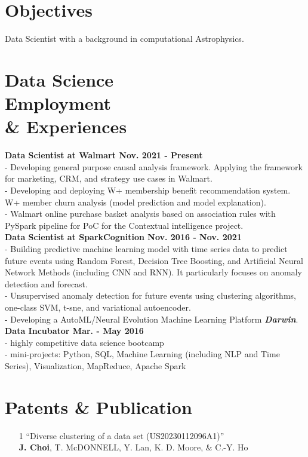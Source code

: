 \documentclass[margin,centered]{res}
\begin{document}
\begin{resume}

\vspace{-0.0cm}
\section{Objectives} Data Scientist with a background in computational Astrophysics.


\section{Data Science \\ Employment \\ \& Experiences}
{\bf Data Scientist at Walmart Nov. 2021 - Present} \\
- Developing general purpose causal analysis framework. Applying the framework for marketing, CRM, and strategy use cases in Walmart. \\
- Developing and deploying W+ membership benefit recommendation system. W+ member churn analysis (model prediction and model explanation).\\
- Walmart online purchase basket analysis based on association rules with PySpark pipeline for PoC for the Contextual intelligence project.\\
{\bf Data Scientist at SparkCognition Nov. 2016 - Nov. 2021} \\
- Building predictive machine learning model with time series data to predict future events using Random Forest, Decision Tree Boosting, and Artificial Neural Network Methods (including CNN and RNN). It particularly focuses on anomaly detection and forecast.\\
- Unsupervised anomaly detection for future events using clustering algorithms, one-class SVM, t-sne, and variational autoencoder. \\
- Developing a AutoML/Neural Evolution Machine Learning Platform {\bf {\it Darwin}}.\\
{\bf Data Incubator Mar. - May 2016}  \\
- highly competitive data science bootcamp \\
- mini-projects: Python, SQL, Machine Learning (including NLP and Time Series), Visualization, MapReduce, Apache Spark \\

\section{Patents \& Publication}
\begin{enumerate}
\item[1] ``Diverse clustering of a data set (US20230112096A1)'' \\ \textbf{J. Choi}, T. McDONNELL, Y. Lan, K. D. Moore, \& C.-Y. Ho


\end{enumerate}
\end{resume}
\end{document}
